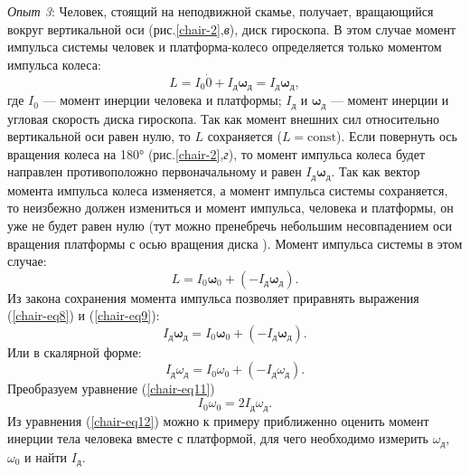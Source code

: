 \documentclass[14pt,a4paper,oneside]{extarticle}	%
\begin{document}
\textit{Опыт 3}:
Человек, стоящий на неподвижной скамье, получает, вращающийся вокруг вертикальной оси (рис.\ref{chair-2},\textit{в}), диск гироскопа. 
В этом случае момент импульса системы человек и платформа-колесо определяется только моментом импульса колеса:
\begin{equation}\label{chair-eq8}
L = I_{0} \dot 0 + I_{\text{д}}\bm{\omega}_{\text{д}} = I_{\text{д}}\bm{\omega}_{\text{д}},
\end{equation}
где $ I_{0} $ — момент инерции человека и платформы; $ I_{\text{д}} $ и $ \bm{\omega}_{\text{д}} $ — момент инерции и угловая скорость диска гироскопа.
Так как момент внешних сил относительно вертикальной оси равен нулю, то $ L $ сохраняется ($ L = \text{const} $).
Если повернуть ось вращения колеса на 180° (рис.\ref{chair-2},\textit{г}), то момент импульса колеса будет направлен противоположно первоначальному и равен $ I_{\text{д}}\bm{\omega}_{\text{д}} $.
Так как вектор момента импульса колеса изменяется, а момент импульса системы сохраняется, то неизбежно должен измениться и момент импульса, человека и платформы, он уже не будет равен нулю (тут можно пренебречь небольшим несовпадением оси вращения платформы с осью вращения диска ).
Момент импульса системы в этом случае:
\begin{equation}\label{chair-eq9}
L = I_{0}\bm{\omega}_{0} + (- I_{\text{д}}\bm{\omega}_{\text{д}}).
\end{equation}
Из закона сохранения момента импульса позволяет приравнять выражения (\ref{chair-eq8}) и (\ref{chair-eq9}):
\begin{equation}\label{chair-eq10}
I_{\text{д}}\bm{\omega}_{\text{д}} = I_{0}\bm{\omega}_{0} + (- I_{\text{д}}\bm{\omega}_{\text{д}}).
\end{equation}
Или в скалярной форме:
\begin{equation}\label{chair-eq11}
I_{\text{д}}\omega_{\text{д}} = I_{0}\omega_{0} + (- I_{\text{д}}\omega_{\text{д}}).
\end{equation}
Преобразуем уравнение (\ref{chair-eq11})
\begin{equation}\label{chair-eq12}
I_{0}\omega_{0} =  2I_{\text{д}}\omega_{\text{д}}.
\end{equation}
Из уравнения (\ref{chair-eq12}) можно к примеру приближенно оценить момент инерции тела человека вместе с платформой, для чего необходимо измерить $ \omega_{\text{д}} $, $ \omega_{0} $ и найти $ I_{\text{д}} $.
\end{document}
